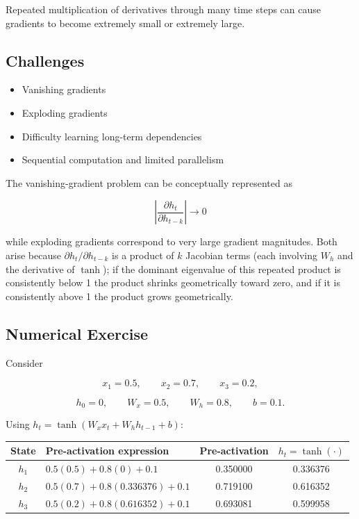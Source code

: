 \documentclass[10pt]{article}
\begin{document}
Repeated multiplication of derivatives through many time steps can cause
gradients to become extremely small or extremely large.

\subsection*{Challenges}

\begin{itemize}
\item Vanishing gradients
\item Exploding gradients
\item Difficulty learning long-term dependencies
\item Sequential computation and limited parallelism
\end{itemize}

The vanishing-gradient problem can be conceptually represented as

\[
\left|\frac{\partial h_t}{\partial h_{t-k}}\right|\rightarrow0
\]

while exploding gradients correspond to very large gradient magnitudes. Both
arise because $\partial h_t/\partial h_{t-k}$ is a product of $k$ Jacobian
terms (each involving $W_h$ and the derivative of $\tanh$); if the dominant
eigenvalue of this repeated product is consistently below 1 the product
shrinks geometrically toward zero, and if it is consistently above 1 the
product grows geometrically.

\subsection*{Numerical Exercise}

Consider

\[
x_1=0.5,\qquad x_2=0.7,\qquad x_3=0.2,
\]

\[
h_0=0,\qquad W_x=0.5,\qquad W_h=0.8,\qquad b=0.1.
\]

Using $h_t=\tanh(W_xx_t+W_hh_{t-1}+b)$:

\begin{center}
\begin{tabular}{|c|l|c|c|}
\hline
State & Pre-activation expression & Pre-activation & $h_t=\tanh(\cdot)$\\
\hline
$h_1$ & $0.5(0.5)+0.8(0)+0.1$ & 0.350000 & 0.336376\\
$h_2$ & $0.5(0.7)+0.8(0.336376)+0.1$ & 0.719100 & 0.616352\\
$h_3$ & $0.5(0.2)+0.8(0.616352)+0.1$ & 0.693081 & 0.599958\\
\hline
\end{tabular}
\end{center}
\end{document}
